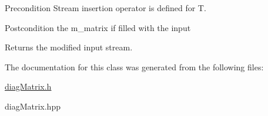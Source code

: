 \begin{DoxyPrecond}{Precondition}
Stream insertion operator is defined for {\ttfamily T}. 
\end{DoxyPrecond}
\begin{DoxyPostcond}{Postcondition}
the m\+\_\+matrix if filled with the input 
\end{DoxyPostcond}
\begin{DoxyReturn}{Returns}
the modified input stream. 
\end{DoxyReturn}


The documentation for this class was generated from the following files\+:\begin{DoxyCompactItemize}
\item 
\hyperlink{diagMatrix_8h}{diag\+Matrix.\+h}\item 
diag\+Matrix.\+hpp\end{DoxyCompactItemize}
